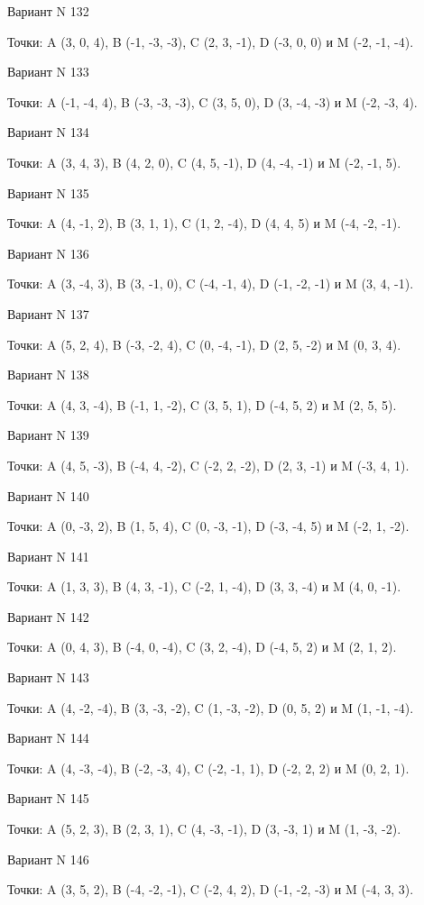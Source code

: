 \documentclass[11pt]{report}
\begin{document}
Вариант N 132

Точки: A (3, 0, 4), B (-1, -3, -3), C (2, 3, -1), D (-3, 0, 0) и M (-2, -1, -4).

Вариант N 133

Точки: A (-1, -4, 4), B (-3, -3, -3), C (3, 5, 0), D (3, -4, -3) и M (-2, -3, 4).

Вариант N 134

Точки: A (3, 4, 3), B (4, 2, 0), C (4, 5, -1), D (4, -4, -1) и M (-2, -1, 5).

Вариант N 135

Точки: A (4, -1, 2), B (3, 1, 1), C (1, 2, -4), D (4, 4, 5) и M (-4, -2, -1).

Вариант N 136

Точки: A (3, -4, 3), B (3, -1, 0), C (-4, -1, 4), D (-1, -2, -1) и M (3, 4, -1).

Вариант N 137

Точки: A (5, 2, 4), B (-3, -2, 4), C (0, -4, -1), D (2, 5, -2) и M (0, 3, 4).

Вариант N 138

Точки: A (4, 3, -4), B (-1, 1, -2), C (3, 5, 1), D (-4, 5, 2) и M (2, 5, 5).

Вариант N 139

Точки: A (4, 5, -3), B (-4, 4, -2), C (-2, 2, -2), D (2, 3, -1) и M (-3, 4, 1).

Вариант N 140

Точки: A (0, -3, 2), B (1, 5, 4), C (0, -3, -1), D (-3, -4, 5) и M (-2, 1, -2).

Вариант N 141

Точки: A (1, 3, 3), B (4, 3, -1), C (-2, 1, -4), D (3, 3, -4) и M (4, 0, -1).

Вариант N 142

Точки: A (0, 4, 3), B (-4, 0, -4), C (3, 2, -4), D (-4, 5, 2) и M (2, 1, 2).

Вариант N 143

Точки: A (4, -2, -4), B (3, -3, -2), C (1, -3, -2), D (0, 5, 2) и M (1, -1, -4).

Вариант N 144

Точки: A (4, -3, -4), B (-2, -3, 4), C (-2, -1, 1), D (-2, 2, 2) и M (0, 2, 1).

Вариант N 145

Точки: A (5, 2, 3), B (2, 3, 1), C (4, -3, -1), D (3, -3, 1) и M (1, -3, -2).

Вариант N 146

Точки: A (3, 5, 2), B (-4, -2, -1), C (-2, 4, 2), D (-1, -2, -3) и M (-4, 3, 3).
\end{document}
